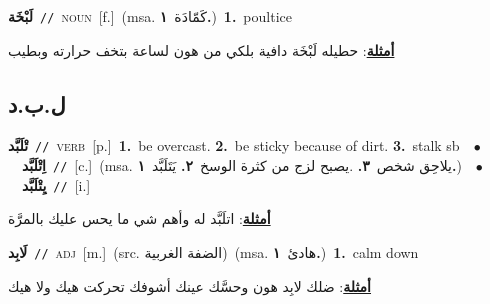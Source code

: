\documentclass[10pt,a4paper,twoside]{article} %
\begin{document}
\begin{multicols}{2}
{\setlength\topsep{0pt}\textbf{\foreignlanguage{arabic}{لَبْخَة}}\ {\color{gray}\texttt{//}\color{black}}\ \textsc{noun}\ [f.]\ \color{gray}(msa. \foreignlanguage{arabic}{كَمّادَة}~\foreignlanguage{arabic}{\textbf{١.}})\color{black}\ \textbf{1.}~poultice\  \begin{flushright}\color{gray}\foreignlanguage{arabic}{\textbf{\underline{\foreignlanguage{arabic}{أمثلة}}}: حطيله لَبْخَة دافية بلكي من هون لساعة بتخف حرارته وبطيب}\end{flushright}\color{black}} \vspace{2mm}

\vspace{-3mm}
\subsection*{\color{blue}\foreignlanguage{arabic}{ل.ب.د}\color{blue}{}} 

{\setlength\topsep{0pt}\textbf{\foreignlanguage{arabic}{تْلَبَّد}}\ {\color{gray}\texttt{//}\color{black}}\ \textsc{verb}\ [p.]\ \textbf{1.}~be overcast.  \textbf{2.}~be sticky because of dirt.  \textbf{3.}~stalk sb\ \ $\bullet$\ \ \setlength\topsep{0pt}\textbf{\foreignlanguage{arabic}{اِتْلَبَّد}}\ {\color{gray}\texttt{//}\color{black}}\ [c.]\ \color{gray}(msa. \foreignlanguage{arabic}{يلاحِق شخص}~\foreignlanguage{arabic}{\textbf{٣.}}  .\foreignlanguage{arabic}{يصبح لزج من كثرة الوسخ}~\foreignlanguage{arabic}{\textbf{٢.}}  \foreignlanguage{arabic}{يَتَلَبَّد}~\foreignlanguage{arabic}{\textbf{١.}})\color{black}\ \ $\bullet$\ \ \setlength\topsep{0pt}\textbf{\foreignlanguage{arabic}{يِتْلَبَّد}}\ {\color{gray}\texttt{//}\color{black}}\ [i.]\  \begin{flushright}\color{gray}\foreignlanguage{arabic}{\textbf{\underline{\foreignlanguage{arabic}{أمثلة}}}: اتلَبَّد له وأهم شي ما يحس عليك بالمرَّة}\end{flushright}\color{black}} \vspace{2mm}

{\setlength\topsep{0pt}\textbf{\foreignlanguage{arabic}{لَابِد}}\ {\color{gray}\texttt{//}\color{black}}\ \textsc{adj}\ [m.]\ (src. \color{gray}\foreignlanguage{arabic}{الضفة الغربية}\color{black})\ \color{gray}(msa. \foreignlanguage{arabic}{هادئ}~\foreignlanguage{arabic}{\textbf{١.}})\color{black}\ \textbf{1.}~calm down\  \begin{flushright}\color{gray}\foreignlanguage{arabic}{\textbf{\underline{\foreignlanguage{arabic}{أمثلة}}}: ضلك لابِد هون وحسَّك عينك أشوفك تحركت هيك ولا هيك}\end{flushright}\color{black}} \vspace{2mm}


\end{multicols}
\end{document}
